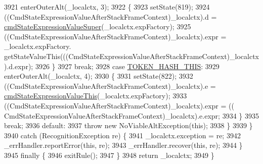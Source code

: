 \begin{DoxyCode}
3921         enterOuterAlt(\_localctx, 3);
3922         \{
3923         setState(819);
3924         ((CmdStateExpressionValueAfterStackFrameContext)\_localctx).d = 
      \hyperlink{classgov_1_1nasa_1_1jpf_1_1inspector_1_1server_1_1expression_1_1parser_1_1_expression_grammar_parser_ae563e67295fa935ca387e0ff9ec0d599}{cmdStateExpressionValueSuper}(\_localctx.expFactory);
3925          ((CmdStateExpressionValueAfterStackFrameContext)\_localctx).expr =  \_localctx.expFactory.
      getStateValueThis(((CmdStateExpressionValueAfterStackFrameContext)\_localctx).d.expr); 
3926         \}
3927         \textcolor{keywordflow}{break};
3928       \textcolor{keywordflow}{case} \hyperlink{classgov_1_1nasa_1_1jpf_1_1inspector_1_1server_1_1expression_1_1parser_1_1_expression_grammar_parser_af93758f3f9ebce6a3618d6e310b155d6}{TOKEN\_HASH\_THIS}:
3929         enterOuterAlt(\_localctx, 4);
3930         \{
3931         setState(822);
3932         ((CmdStateExpressionValueAfterStackFrameContext)\_localctx).e = 
      \hyperlink{classgov_1_1nasa_1_1jpf_1_1inspector_1_1server_1_1expression_1_1parser_1_1_expression_grammar_parser_accf212342e54a654e9832816edfce8e4}{cmdStateExpressionValueThis}(\_localctx.expFactory);
3933          ((CmdStateExpressionValueAfterStackFrameContext)\_localctx).expr =  ((
      CmdStateExpressionValueAfterStackFrameContext)\_localctx).e.expr; 
3934         \}
3935         \textcolor{keywordflow}{break};
3936       \textcolor{keywordflow}{default}:
3937         \textcolor{keywordflow}{throw} \textcolor{keyword}{new} NoViableAltException(\textcolor{keyword}{this});
3938       \}
3939     \}
3940     \textcolor{keywordflow}{catch} (RecognitionException re) \{
3941       \_localctx.exception = re;
3942       \_errHandler.reportError(\textcolor{keyword}{this}, re);
3943       \_errHandler.recover(\textcolor{keyword}{this}, re);
3944     \}
3945     \textcolor{keywordflow}{finally} \{
3946       exitRule();
3947     \}
3948     \textcolor{keywordflow}{return} \_localctx;
3949   \}
\end{DoxyCode}

